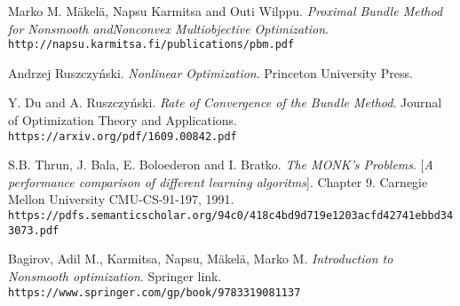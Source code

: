 \begin{thebibliography}{9}
	Marko M. M\"akel\"a, Napsu Karmitsa and Outi Wilppu.
	\textit{Proximal Bundle Method for Nonsmooth andNonconvex Multiobjective Optimization}.
	\\\texttt{http://napsu.karmitsa.fi/publications/pbm.pdf}
	
	Andrzej Ruszczyński.
	\textit{Nonlinear Optimization}. Princeton University Press. 
	
	Y. Du and A. Ruszczyński.
	\textit{Rate of Convergence of the Bundle Method}. Journal  of  Optimization Theory and Applications.
	\\\texttt{https://arxiv.org/pdf/1609.00842.pdf}


	S.B. Thrun, J. Bala, E. Boloederon and I. Bratko.
	\textit{The MONK's Problems}. 
	[\textit{A performance comparison of different learning algoritms}]. Chapter 9.
	Carnegie Mellon University CMU-CS-91-197, 1991.
	\\\texttt{https://pdfs.semanticscholar.org/94c0/418c4bd9d719e1203acfd42741ebbd343073.pdf}
	
	 Bagirov, Adil M., Karmitsa, Napsu, Mäkelä, Marko M.
	\textit{Introduction to Nonsmooth optimization}. Springer link.
	\\\texttt{https://www.springer.com/gp/book/9783319081137}	

 

	
\end{thebibliography}